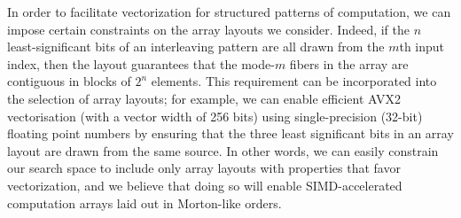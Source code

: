 In order to facilitate vectorization for structured patterns of computation, we can impose certain constraints on the array layouts we consider. Indeed, if the $n$ least-significant bits of an interleaving pattern are all drawn from the $m$th input index, then the layout guarantees that the mode-$m$ fibers in the array are contiguous in blocks of $2^n$ elements. This requirement can be incorporated into the selection of array layouts; for example, we can enable efficient AVX2 vectorisation (with a vector width of 256 bits) using single-precision (32-bit) floating point numbers by ensuring that the three least significant bits in an array layout are drawn from the same source. In other words, we can easily constrain our search space to include only array layouts with properties that favor vectorization, and we believe that doing so will enable SIMD-accelerated computation arrays laid out in Morton-like orders.
